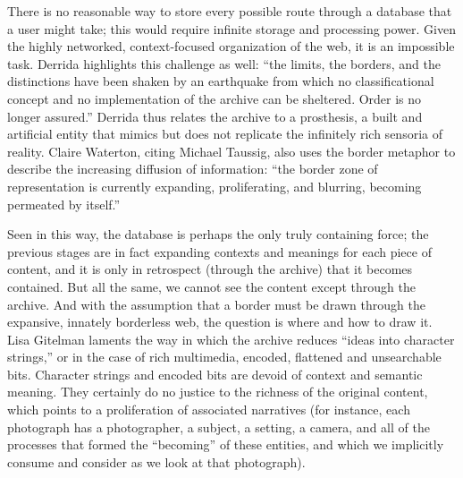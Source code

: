 There is no reasonable way to store every possible route through a database that a user might take; this would require infinite storage and processing power. Given the highly networked, context-focused organization of the web, it is an impossible task. Derrida highlights this challenge as well: ``the limits, the borders, and the distinctions have been shaken by an earthquake from which no classificational concept and no implementation of the archive can be sheltered. Order is no longer assured.''  Derrida thus relates the archive to a prosthesis, a built and artificial entity that mimics but does not replicate the infinitely rich sensoria of reality. Claire Waterton, citing Michael Taussig, also uses the border metaphor to describe the increasing diffusion of information: ``the border zone of representation is currently expanding, proliferating, and blurring, becoming permeated by itself.'' 

Seen in this way, the database is perhaps the only truly containing force; the previous stages are in fact expanding contexts and meanings for each piece of content, and it is only in retrospect (through the archive) that it becomes contained. But all the same, we cannot see the content except through the archive. And with the assumption that a border must be drawn through the expansive, innately borderless web, the question is where and how to draw it. Lisa Gitelman laments the way in which the archive reduces ``ideas into character strings,'' or in the case of rich multimedia, encoded, flattened and unsearchable bits.  Character strings and encoded bits are devoid of context and semantic meaning. They certainly do no justice to the richness of the original content, which points to a proliferation of associated narratives (for instance, each photograph has a photographer, a subject, a setting, a camera, and all of the processes that formed the ``becoming'' of these entities, and which we implicitly consume and consider as we look at that photograph).


